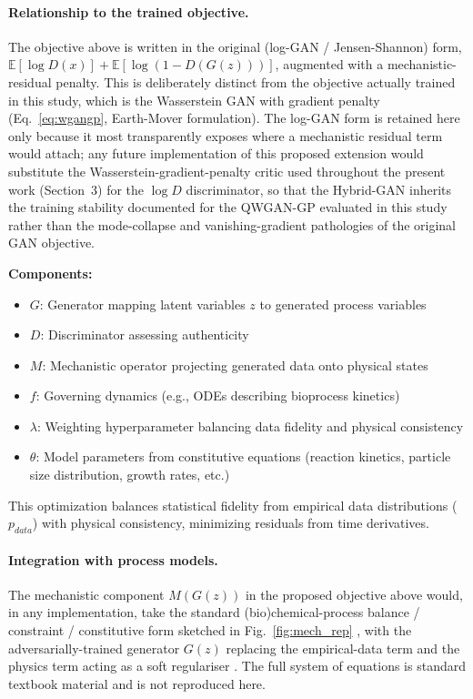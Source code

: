 \paragraph{Relationship to the trained objective.} The objective above is
written in the original (log-GAN / Jensen-Shannon) form,
$\mathbb{E}[\log D(x)] + \mathbb{E}[\log(1-D(G(z)))]$, augmented with a
mechanistic-residual penalty. This is deliberately distinct from the objective
actually trained in this study, which is the Wasserstein GAN with gradient
penalty (Eq.~\ref{eq:wgangp}, Earth-Mover formulation). The log-GAN form is
retained here only because it most transparently exposes where a mechanistic
residual term would attach; any future implementation of this proposed
extension would substitute the Wasserstein-gradient-penalty critic used
throughout the present work (Section~3) for the $\log D$ discriminator, so that
the Hybrid-GAN inherits the training stability documented for the
QWGAN-GP evaluated in this study rather than the mode-collapse and
vanishing-gradient pathologies of the original GAN objective.

\textbf{Components:}
\begin{itemize}[nosep, leftmargin=*]
 \item $G$: Generator mapping latent variables $z$ to generated process variables
 \item $D$: Discriminator assessing authenticity
 \item $M$: Mechanistic operator projecting generated data onto physical states
 \item $f$: Governing dynamics (e.g., ODEs describing bioprocess kinetics)
 \item $\lambda$: Weighting hyperparameter balancing data fidelity and physical consistency
 \item $\theta$: Model parameters from constitutive equations (reaction kinetics, particle size distribution, growth rates, etc.)
\end{itemize}

This optimization balances statistical fidelity from empirical data distributions ($p_{data}$) with physical consistency, minimizing residuals from time derivatives.

\paragraph{Integration with process models.}
The mechanistic component $M(G(z))$ in the proposed objective above
would, in any implementation, take the standard
(bio)chemical-process balance / constraint / constitutive form
sketched in Fig.~\ref{fig:mech_rep} \cite{mansouri2025models}, with
the adversarially-trained generator $G(z)$ replacing the
empirical-data term and the physics term acting as a soft regulariser
\cite{rice2020overfittingadversariallyrobustdeep, hermann2025hybrid}.
The full system of equations is standard textbook material and is not
reproduced here.


